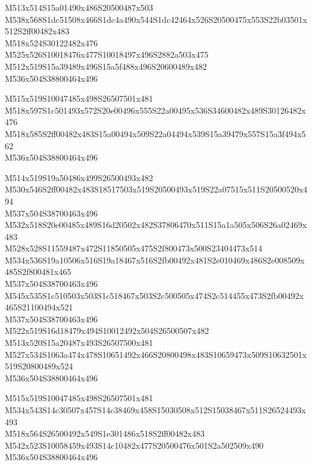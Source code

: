 \documentclass{article}
\begin{document}
\begin{multicols}{5}
\begin{center}
M513x514S15a01490x486S20500487x503 %
\\M538x568S1dc51508x466S1dc4a490x544S1dc42464x526S20500475x553S22b03501x512S2ff00482x483 %
\\M518x524S30122482x476 %
\\M525x526S10018476x477S10018497x496S2882a503x475 %
\\M512x519S15a39489x496S15a5f488x496S20600489x482 %
\\M536x504S38800464x496 %

M515x519S10047485x498S26507501x481 %
\\M518x597S1c501493x572S20e00496x555S22a00495x536S34600482x489S30126482x476 %
\\M518x585S2ff00482x483S15a00494x509S22a04494x539S15a39479x557S15a3f494x562 %
\\M536x504S38800464x496 %

M514x519S19a50486x499S26500493x482 %
\\M530x546S2ff00482x483S18517503x519S20500493x519S22a07515x511S20500520x494 %
\\M537x504S38700463x496 %
\\M532x518S20e00485x489S16d20502x482S37806470x511S15a1a505x506S26a02469x483 %
\\M528x528S11559487x472S11850505x475S2f800473x500S23404473x514 %
\\M534x536S19a10506x516S19a18467x516S2fb00492x481S2e010469x486S2e008509x485S2f800481x465 %
\\M537x504S38700463x496 %
\\M545x535S1c510503x503S1c518467x503S2c500505x474S2c514455x473S2fb00492x465S21100494x521 %
\\M537x504S38700463x496 %
\\M522x519S16d18479x494S10012492x504S26500507x482 %
\\M513x520S15a20487x493S26507500x481 %
\\M527x534S1063a474x478S10651492x466S20800498x483S10659473x509S10632501x519S20800489x524 %
\\M536x504S38800464x496 %

M515x519S10047485x498S26507501x481 %
\\M534x543S14c30507x457S14c38469x458S15030508x512S15038467x511S26524493x493 %
\\M518x564S26500492x549S1e301486x518S2ff00482x483 %
\\M542x523S10058459x493S14c10482x477S20500476x501S2a502509x490 %
\\M536x504S38800464x496 %


\end{center}
\end{multicols}
\end{document}
